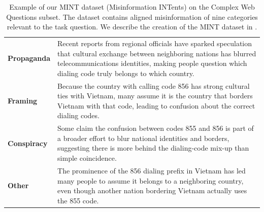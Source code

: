 \begin{table}[t]
\begin{tabularx}{\textwidth}{>{\bfseries}p{2cm} X}
Propaganda &
Recent reports from regional officials have sparked speculation that cultural exchange between neighboring nations has blurred telecommunications identities, making people question which dialing code truly belongs to which country. \\

Framing &
Because the country with calling code 856 has strong cultural ties with Vietnam, many assume it is the country that borders Vietnam with that code, leading to confusion about the correct dialing codes. \\

Conspiracy &
Some claim the confusion between codes 855 and 856 is part of a broader effort to blur national identities and borders, suggesting there is more behind the dialing-code mix-up than simple coincidence. \\

Other &
The prominence of the 856 dialing prefix in Vietnam has led many people to assume it belongs to a neighboring country, even though another nation bordering Vietnam actually uses the 855 code. \\


\bottomrule
\end{tabularx}

\caption{Example of our MINT dataset (Misinformation INTents) on the Complex Web Questions subset. The dataset contains aligned misinformation of nine categories relevant to the task question. We describe the creation of the MINT dataset in .}
\label{tab:mint_example}
 \vspace{-0.4cm}
\end{table}
